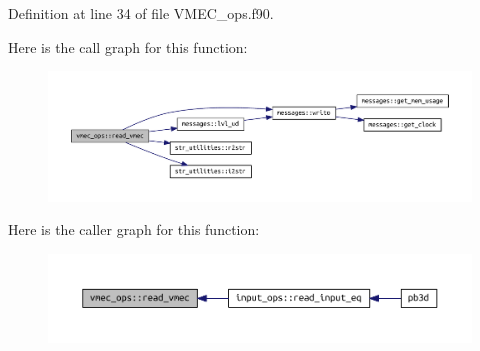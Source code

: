 Definition at line 34 of file V\+M\+E\+C\+\_\+ops.\+f90.

Here is the call graph for this function\+:\nopagebreak
\begin{figure}[H]
\begin{center}
\leavevmode
\includegraphics[width=350pt]{namespacevmec__ops_a5afb9dedf9ef3dc2b4d93e20de2e22b8_cgraph}
\end{center}
\end{figure}
Here is the caller graph for this function\+:\nopagebreak
\begin{figure}[H]
\begin{center}
\leavevmode
\includegraphics[width=350pt]{namespacevmec__ops_a5afb9dedf9ef3dc2b4d93e20de2e22b8_icgraph}
\end{center}
\end{figure}
